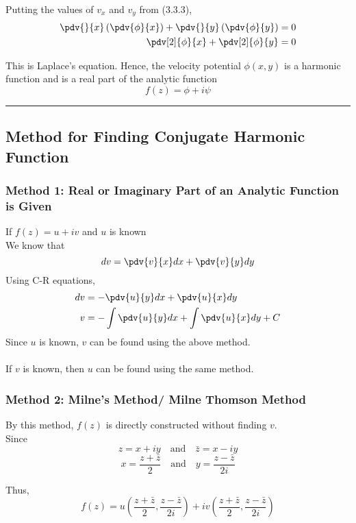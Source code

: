 Putting the values of $v_x$ and $v_y$ from (3.3.3),
\begin{align*}
    \pdv{}{x} \left( \pdv{\phi}{x} \right) + \pdv{}{y} \left( \pdv{\phi}{y} \right) &= 0 \\
    \pdv[2]{\phi}{x} + \pdv[2]{\phi}{y} &= 0
\end{align*}

This is Laplace's equation. Hence, the velocity potential $\phi(x,y)$ is a harmonic function and is a real part of the analytic function
\[
    f(z) = \phi + i\psi
\]

\vspace{20pt}\rule{3in}{1pt}


\subsection{Method for Finding Conjugate Harmonic Function}
\subsubsection{Method 1: Real or Imaginary Part of an Analytic Function is Given}
If $f(z) = u + iv$ and $u$ is known \\

We know that \[
    d{v} = \pdv{v}{x} d{x} + \pdv{v}{y} d{y}
\] 
Using C-R equations,
\begin{align*}
    d{v} &= -\pdv{u}{y} d{x} + \pdv{u}{x} d{y} \\
    v &= -\int \pdv{u}{y} d{x} + \int \pdv{u}{x} d{y} + C
\end{align*}
Since $u$ is known, $v$ can be found using the above method. \\~\\

If $v$ is known, then $u$ can be found using the same method.

\subsubsection{Method 2: Milne's Method/ Milne Thomson Method}
By this method, $f(z)$ is directly constructed without finding $v$. \\
Since \[
    z = x + iy \quad \text{and} \quad \bar{z} = x - iy
\] \[
    x = \frac{z + \bar{z}}{2} \quad \text{and} \quad y = \frac{z - \bar{z}}{2i}
\] 

Thus,
\begin{equation}
    \boxed{ f(z) = u\left( \frac{z + \bar{z}}{2}, \frac{z - \bar{z}}{2i} \right) + iv\left( \frac{z + \bar{z}}{2}, \frac{z - \bar{z}}{2i} \right) }
\end{equation} \\~\\

